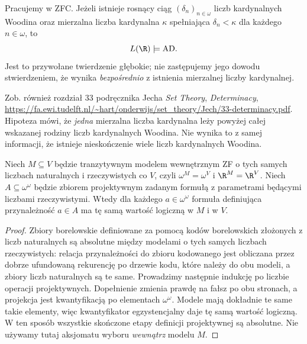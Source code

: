 \begin{twierdzenie}
\label{thm:martin-steel-woodin-lr}
Pracujemy w ZFC. Jeżeli istnieje rosnący ciąg
$(\delta_n)_{n\in\omega}$ liczb kardynalnych
Woodina oraz mierzalna liczba kardynalna
$\kappa$ spełniająca $\delta_n<\kappa$ dla
każdego $n\in\omega$, to
\[
 L(\R)\models\mathrm{AD}.
\]
Jest to przywołane twierdzenie głębokie;
nie zastępujemy jego dowodu stwierdzeniem,
że wynika \emph{bezpośrednio} z istnienia
mierzalnej liczby kardynalnej.
\end{twierdzenie}
\begin{uwaga}
Zob. również rozdział 33 podręcznika Jecha
\emph{Set Theory}, \emph{Determinacy},
\url{https://fa.ewi.tudelft.nl/~hart/onderwijs/set_theory/Jech/33-determinacy.pdf}.
Hipoteza mówi, że \emph{jedna} mierzalna liczba
kardynalna leży powyżej całej wskazanej rodziny
liczb kardynalnych Woodina. Nie wynika to z samej
informacji, że istnieje nieskończenie wiele
liczb kardynalnych Woodina.
\end{uwaga}

\begin{lemat}
\label{lem:projective-same-reals}
Niech $M\subseteq V$ będzie tranzytywnym modelem
wewnętrznym ZF o tych samych liczbach naturalnych
i rzeczywistych co $V$, czyli
$\omega^M=\omega^V$ i $\R^M=\R^V$.
Niech $A\subseteq\omega^\omega$ będzie zbiorem
projektywnym zadanym formułą z parametrami będącymi
liczbami rzeczywistymi. Wtedy dla każdego
$a\in\omega^\omega$ formuła definiująca
przynależność $a\in A$ ma tę samą wartość logiczną
w $M$ i w $V$.
\end{lemat}
\begin{proof}
Zbiory borelowskie definiowane za pomocą kodów
borelowskich złożonych z liczb naturalnych są
absolutne między modelami o tych samych liczbach
rzeczywistych: relacja przynależności do zbioru
kodowanego jest obliczana przez dobrze ufundowaną
rekurencję po drzewie kodu, które należy do obu
modeli, a zbiory liczb naturalnych są te same.
Prowadzimy następnie indukcję po liczbie operacji
projektywnych. Dopełnienie zmienia prawdę
na fałsz po obu stronach, a projekcja jest
kwantyfikacją po elementach $\omega^\omega$.
Modele mają dokładnie te same takie elementy,
więc kwantyfikator egzystencjalny daje tę samą
wartość logiczną. W ten sposób wszystkie
skończone etapy definicji projektywnej są
absolutne. Nie używamy tutaj aksjomatu wyboru
\emph{wewnątrz} modelu $M$.
\end{proof}

